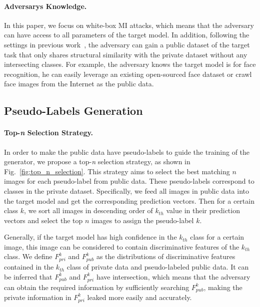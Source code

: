\documentclass[letterpaper]{article} %
\newcommand{\Fref}[1]{Fig.~\ref{#1}}
\begin{document}
\paragraph{Adversarys Knowledge.}
In this paper, we focus on white-box MI attacks, which means that the adversary can have access to all parameters of the target model. In addition, following the settings in previous work~\cite{zhang2020secret, chen2021knowledge, kahla2022label}, the adversary can gain a public dataset of the target task that only shares structural similarity with the private dataset without any intersecting classes. For example, the adversary knows the target model is for face recognition, he can easily leverage an existing open-sourced face dataset or crawl face images from the Internet as the public data.

\subsection{Pseudo-Labels Generation}

\paragraph{Top-\emph{n} Selection Strategy.}
In order to make the public data have pseudo-labels to guide the training of the generator, we propose a top-\emph{n} selection strategy, as shown in \Fref{fig:top_n_selection}. This strategy aims to select the best matching $n$ images for each pseudo-label from public data. These pseudo-labels correspond to classes in the private dataset. Specifically, we feed all images in public data into the target model and get the corresponding prediction vectors. Then for a certain class $k$, we sort all images in descending order of $k_{th}$ value in their prediction vectors and select the top $n$ images to assign the pseudo-label $k$.


Generally, if the target model has high confidence in the $k_{th}$ class for a certain image, this image can be considered to contain discriminative features of the $k_{th}$ class. We define $F^{k}_{pri}$ and $F^{k}_{pub}$ as the distributions of discriminative features contained in the $k_{th}$ class of private data and pseudo-labeled public data. It can be inferred that $F^{k}_{pub}$ and $F^{k}_{pri}$ have intersection, which means that the adversary can obtain the required information by sufficiently searching $F^{k}_{pub}$, making the private information in $F^{k}_{pri}$ leaked more easily and accurately.
\end{document}
